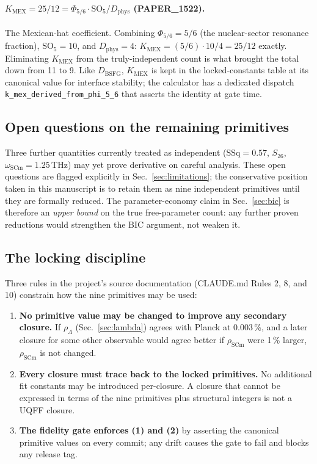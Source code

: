 \paragraph{$K_{\text{MEX}} = 25/12 = \Phi_{5/6}\cdot \mathrm{SO}_5/D_{\text{phys}}$
(PAPER\_1522).}
The Mexican-hat coefficient. Combining
$\Phi_{5/6} = 5/6$ (the nuclear-sector resonance fraction),
$\mathrm{SO}_5 = 10$, and $D_{\text{phys}} = 4$:
$K_{\text{MEX}} = (5/6)\cdot 10/4 = 25/12$ exactly. Eliminating
$K_{\text{MEX}}$ from the truly-independent count is what brought
the total down from 11 to 9. Like $D_{\text{BSFG}}$, $K_{\text{MEX}}$
is kept in the locked-constants table at its canonical value for
interface stability; the calculator has a dedicated dispatch
\texttt{k\_mex\_derived\_from\_phi\_5\_6} that asserts the
identity at gate time.

\subsection{Open questions on the remaining primitives}
\label{sec:open_primitives}

Three further quantities currently treated as independent
($\mathrm{SSq} = 0.57$, $S_{26}$, $\omega_{\text{SCm}} = 1.25\,\mathrm{THz}$)
may yet prove derivative on careful analysis. These open questions are
flagged explicitly in Sec.~\ref{sec:limitations}; the conservative
position taken in this manuscript is to retain them as nine
independent primitives until they are formally reduced. The
parameter-economy claim in Sec.~\ref{sec:bic} is therefore an
\emph{upper bound} on the true free-parameter count: any further
proven reductions would strengthen the BIC argument, not weaken it.

\subsection{The locking discipline}
\label{sec:locking_discipline}

Three rules in the project's source documentation (CLAUDE.md Rules 2,
8, and 10) constrain how the nine primitives may be used:

\begin{enumerate}
  \item \textbf{No primitive value may be changed to improve any
        secondary closure.} If $\rho_\Lambda$ (Sec.~\ref{sec:lambda})
        agrees with Planck at 0.003\,\%, and a later closure for some
        other observable would agree better if $\rho_{\text{SCm}}$
        were 1\,\% larger, $\rho_{\text{SCm}}$ is not changed.
  \item \textbf{Every closure must trace back to the locked
        primitives.} No additional fit constants may be introduced
        per-closure. A closure that cannot be expressed in terms of
        the nine primitives plus structural integers is not a
        UQFF closure.
  \item \textbf{The fidelity gate enforces (1) and (2)} by asserting
        the canonical primitive values on every commit; any drift
        causes the gate to fail and blocks any release tag.
\end{enumerate}

